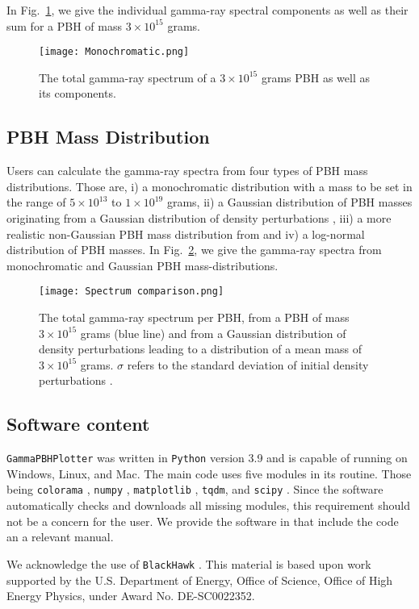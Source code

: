 \documentclass[11pt]{article}
\renewcommand{\cite}{\citep}
\let\RefOrig\ref
\renewcommand{\ref}[1]{\textcolor{blue}{\RefOrig{#1}}}
\begin{document}
In Fig.~\ref{fig:PBHspectral_components}, we give the individual gamma-ray spectral components as well as their sum for a PBH of mass $3\times 10^{15}$ grams.
\begin{figure}
    \centering
    \texttt{[image: Monochromatic.png]}
    \caption{The total gamma-ray spectrum of a $3\times10^{15}$ grams PBH as well as its components.}
    \label{fig:PBHspectral_components}
\end{figure}

\subsection{PBH Mass Distribution}
Users can calculate the gamma-ray spectra from four types of PBH mass distributions. Those are, i) a monochromatic distribution with a mass to be set in the range of $5\times 10^{13}$ to $1\times 10^{19}$ grams, ii) a Gaussian distribution of PBH masses originating from a Gaussian distribution of density perturbations \cite{Biagetti:2021eep}, iii) a more realistic non-Gaussian PBH mass distribution from \cite{Biagetti:2021eep} and iv) a log-normal distribution of PBH masses. 
In Fig.~\ref{fig:PBHmass_distr_spectra}, we give the gamma-ray spectra from monochromatic and Gaussian PBH mass-distributions.
\begin{figure}
    \centering
    \texttt{[image: Spectrum comparison.png]}
    \caption{The total gamma-ray spectrum per PBH, from a PBH of mass $3 \times 10^{15}$ grams (blue line) and from a Gaussian distribution of density perturbations leading to a distribution of a mean mass of $3 \times 10^{15}$ grams. $\sigma$ refers to the standard deviation of initial density perturbations \cite{Biagetti:2021eep}.}
    \label{fig:PBHmass_distr_spectra}
\end{figure}

\subsection{Software content}
\texttt{GammaPBHPlotter} was written in \texttt{Python} version 3.9 and is capable of running on Windows, Linux, and Mac. The main code uses five modules in its routine. Those being \texttt{colorama} \cite{hartley_colorama_046_2022}, \texttt{numpy} \cite{harris_array_numpy_2020}, \texttt{matplotlib} \cite{hunter_matplotlib_2007}, \texttt{tqdm}, \cite{dacostaluis_tqdm_zenodo_2024} and \texttt{scipy} \cite{virtanen_scipy_2020}. Since the software automatically checks and downloads all missing modules, this requirement should not be a concern for the user. We provide the software in \cite{ZenodoLink} that include the code an a relevant manual.

We acknowledge the use of \texttt{BlackHawk} \cite{Arbey:2021mbl}. This material is based upon work supported by the U.S. Department of Energy, Office of Science, 
Office of High Energy Physics, under Award No. DE-SC0022352.


\end{document}
